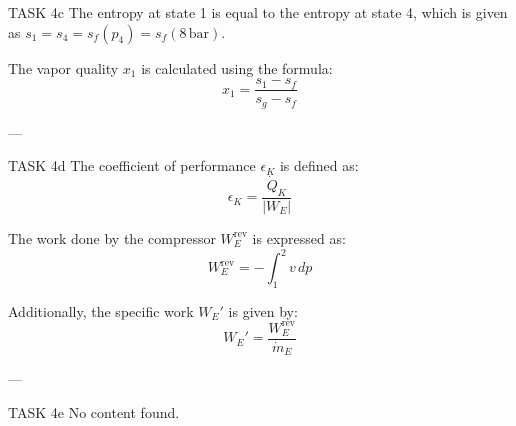 TASK 4c  
The entropy at state 1 is equal to the entropy at state 4, which is given as \( s_1 = s_4 = s_f(p_4) = s_f(8 \, \text{bar}) \).  

The vapor quality \( x_1 \) is calculated using the formula:  
\[
x_1 = \frac{s_1 - s_f}{s_g - s_f}
\]  

---

TASK 4d  
The coefficient of performance \( \epsilon_K \) is defined as:  
\[
\epsilon_K = \frac{\dot{Q}_K}{|W_E|}
\]  

The work done by the compressor \( W_E^{\text{rev}} \) is expressed as:  
\[
W_E^{\text{rev}} = - \int_{1}^{2} v \, dp
\]  

Additionally, the specific work \( W_E' \) is given by:  
\[
W_E' = \frac{W_E^{\text{rev}}}{\dot{m}_E}
\]  

---

TASK 4e  
No content found.